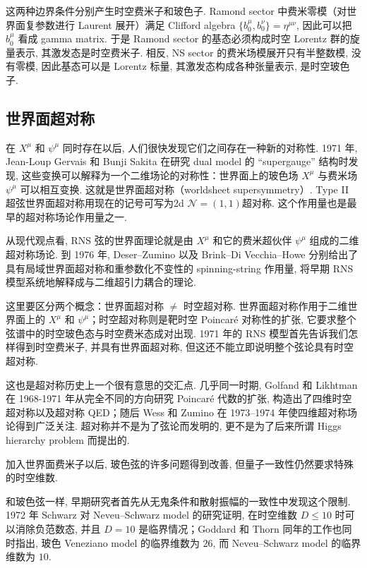 \documentclass[10pt]{article}
\numberwithin{equation}{section}
\begin{document}
这两种边界条件分别产生时空费米子和玻色子. Ramond sector 中费米零模（对世界面复参数进行 Laurent 展开）满足 Clifford algebra $\{b_0^\mu, b_0^\nu\}=\eta^{\mu\nu}$, 因此可以把 $b_0^\mu$ 看成 gamma matrix. 于是 Ramond sector 的基态必须构成时空 Lorentz 群的旋量表示, 其激发态是时空费米子. 相反, NS sector 的费米场模展开只有半整数模, 没有零模, 因此基态可以是 Lorentz 标量, 其激发态构成各种张量表示, 是时空玻色子. 

\subsection{世界面超对称}

在 $X^\mu$ 和 $\psi^\mu$ 同时存在以后, 人们很快发现它们之间存在一种新的对称性. 1971 年, Jean-Loup Gervais 和 Bunji Sakita 在研究 dual model 的 “supergauge” 结构时发现, 这些变换可以解释为一个二维场论的对称性：世界面上的玻色场 $X^\mu$ 与费米场 $\psi^\mu$ 可以相互变换. 这就是世界面超对称（worldsheet supersymmetry）. Type II 超弦世界面超对称用现在的记号可写为2d $\mathcal{N}=(1,1)$超对称. 这个作用量也是最早的超对称场论作用量之一\cite{GervaisSakita1971}. 

从现代观点看, RNS 弦的世界面理论就是由 $X^\mu$ 和它的费米超伙伴 $\psi^\mu$ 组成的二维超对称场论. 到 1976 年, Deser–Zumino 以及 Brink–Di Vecchia–Howe 分别给出了具有局域世界面超对称和重参数化不变性的 spinning-string 作用量, 将早期 RNS 模型系统地解释成与二维超引力耦合的理论\cite{BrinkDiVecchiaHowe1976,DeserZumino1976}. 

这里要区分两个概念：世界面超对称 $\neq$ 时空超对称. 世界面超对称作用于二维世界面上的 $X^\mu$ 和 $\psi^\mu$；时空超对称则是靶时空 Poincaré 对称性的扩张, 它要求整个弦谱中的时空玻色态与时空费米态成对出现. 1971 年的 RNS 模型首先告诉我们怎样得到时空费米子, 并具有世界面超对称, 但这还不能立即说明整个弦论具有时空超对称. 

这也是超对称历史上一个很有意思的交汇点. 几乎同一时期, Golfand 和 Likhtman 在 1968-1971 年从完全不同的方向研究 Poincaré 代数的扩张, 构造出了四维时空超对称以及超对称 QED；随后 Wess 和 Zumino 在 1973–1974 年使四维超对称场论得到广泛关注\cite{GolfandLikhtman1971,WessZumino1974}. 超对称并不是为了弦论而发明的, 更不是为了后来所谓 Higgs hierarchy problem 而提出的. 

加入世界面费米子以后, 玻色弦的许多问题得到改善, 但量子一致性仍然要求特殊的时空维数. 

和玻色弦一样, 早期研究者首先从无鬼条件和散射振幅的一致性中发现这个限制. 1972 年 Schwarz 对 Neveu–Schwarz model 的研究证明, 在时空维数 $D\leq10$ 时可以消除负范数态, 并且 $D=10$ 是临界情况；Goddard 和 Thorn 同年的工作也同时指出, 玻色 Veneziano model 的临界维数为 $26$, 而 Neveu–Schwarz model 的临界维数为 $10$\cite{Schwarz1972,GoddardThorn1972}. 
\end{document}
